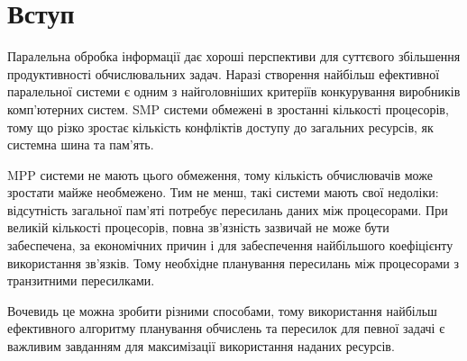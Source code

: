 \section{Вступ}

Паралельна обробка інформації дає хороші перспективи для суттєвого збільшення продуктивності обчислювальних задач. Наразі створення найбільш ефективної паралельної системи є одним з найголовніших критеріїв конкурування виробників комп'ютерних систем. SMP системи обмежені в зростанні кількості процесорів, тому що різко зростає кількість конфліктів доступу до загальних ресурсів, як системна шина та пам'ять.

MPP системи не мають цього обмеження, тому кількість обчислювачів може зростати майже необмежено. Тим не менш, такі системи мають свої недоліки: відсутність загальної пам'яті потребує пересилань даних між процесорами. При великій кількості процесорів, повна зв'язність зазвичай не може бути забеспечена, за економічних причин і для забеспечення найбільшого коефіцієнту використання зв'язків. Тому необхідне планування пересилань між процесорами з транзитними пересилками.

Вочевидь це можна зробити різними способами, тому використання найбільш ефективного алгоритму планування обчислень та пересилок для певної задачі є важливим завданням для максимізації використання наданих ресурсів.
